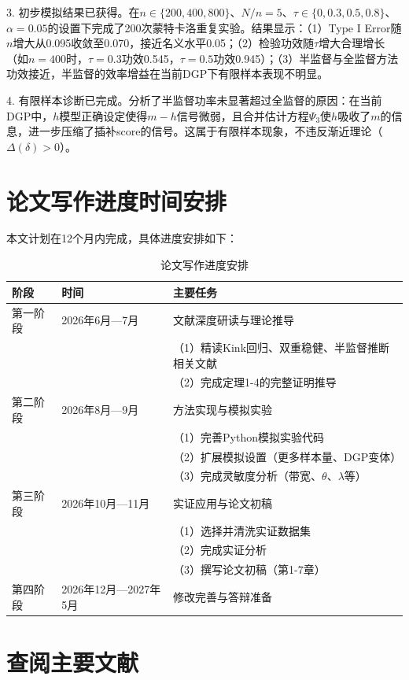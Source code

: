\documentclass[12pt,a4paper]{ctexart}
\begin{document}
3. 初步模拟结果已获得。在$n \in \{200, 400, 800\}$、$N/n = 5$、$\tau \in \{0, 0.3, 0.5, 0.8\}$、$\alpha = 0.05$的设置下完成了200次蒙特卡洛重复实验。结果显示：（1）Type I Error随$n$增大从0.095收敛至0.070，接近名义水平0.05；（2）检验功效随$\tau$增大合理增长（如$n=400$时，$\tau=0.3$功效0.545，$\tau=0.5$功效0.945）；（3）半监督与全监督方法功效接近，半监督的效率增益在当前DGP下有限样本表现不明显。

4. 有限样本诊断已完成。分析了半监督功率未显著超过全监督的原因：在当前DGP中，$h$模型正确设定使得$m-h$信号微弱，且合并估计方程$\Psi_3$使$h$吸收了$m$的信息，进一步压缩了插补score的信号。这属于有限样本现象，不违反渐近理论（$\Delta(\delta) > 0$）。

\section{论文写作进度时间安排}

本文计划在12个月内完成，具体进度安排如下：

\begin{table}[htbp]
\centering
\caption{论文写作进度安排}
\label{tab:schedule}
\begin{tabular}{p{2cm}p{4cm}p{7cm}}
\toprule
\textbf{阶段} & \textbf{时间} & \textbf{主要任务} \\
\midrule
第一阶段 & 2026年6月—7月 & 文献深度研读与理论推导 \\
 & & （1）精读Kink回归、双重稳健、半监督推断相关文献 \\
 & & （2）完成定理1-4的完整证明推导 \\
\midrule
第二阶段 & 2026年8月—9月 & 方法实现与模拟实验 \\
 & & （1）完善Python模拟实验代码 \\
 & & （2）扩展模拟设置（更多样本量、DGP变体） \\
 & & （3）完成灵敏度分析（带宽、$\theta$、$\lambda$等） \\
\midrule
第三阶段 & 2026年10月—11月 & 实证应用与论文初稿 \\
 & & （1）选择并清洗实证数据集 \\
 & & （2）完成实证分析 \\
 & & （3）撰写论文初稿（第1-7章） \\
\midrule
第四阶段 & 2026年12月—2027年5月 & 修改完善与答辩准备 \\
\bottomrule
\end{tabular}
\end{table}

\section{查阅主要文献}

\printbibliography[heading=none]
\end{document}

